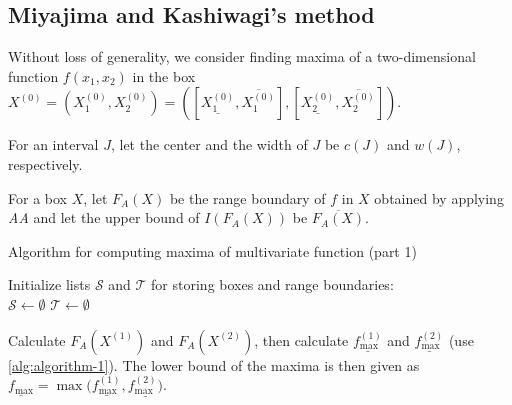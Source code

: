 \documentclass[fontsize=12pt,a4paper]{scrartcl} %
\begin{document}
\subsection{Miyajima and Kashiwagi's method}

Without loss of generality, we consider finding maxima of a two-dimensional function $f(x_1, x_2)$ in the box $X^{(0)} = (X_1^{(0)}, X_2^{(0)}) = ([\underline{X_1^{(0)}}, \overline{X_1^{(0)}}], [\underline{X_2^{(0)}}, \overline{X_2^{(0)}}])$.

For an interval $J$, let the center and the width of $J$ be $c(J)$ and $w(J)$, respectively.

For a box $X$, let $F_A(X)$ be the range boundary of $f$ in $X$ obtained by applying \emph{AA} and let the upper bound of $I(F_A(X))$ be $\overline{F_A(X)}$.

\begin{algorithm}
    \caption{Algorithm for computing maxima of multivariate function (part 1)}\label{alg:minima-maxima-p1}
    
    Initialize lists $\mathcal{S}$ and $\mathcal{T}$ for storing boxes and range boundaries:\\
    $\mathcal{S} \gets \emptyset$\;
    $\mathcal{T} \gets \emptyset$\;
    

    Calculate $F_A(X^{(1)})$ and $F_A(X^{(2)})$, then calculate $\underline{f_{\max}^{(1)}}$ and $\underline{f_{\max}^{(2)}}$ (use \cref{alg:algorithm-1}). The lower bound of the maxima is then given as $\underline{f_{\max}} = \max(\underline{f^{(1)}_{\max}}, \underline{f^{(2)}_{\max})}$.
    
\end{algorithm}
\end{document}
